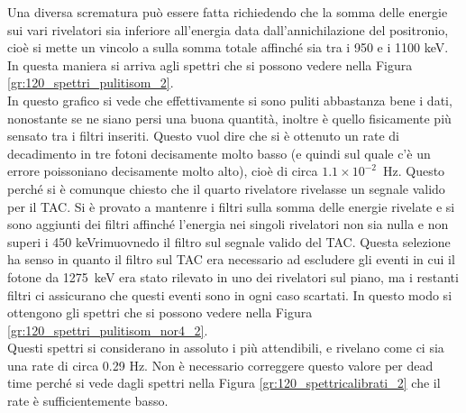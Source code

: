 Una diversa scrematura può essere fatta richiedendo che la somma delle energie sui vari rivelatori sia inferiore all'energia data dall'annichilazione del positronio, cioè si
mette un vincolo a sulla somma totale affinché sia tra i 950 e i 1100 keV. In questa maniera si arriva agli spettri che si possono vedere nella 
Figura \ref{gr:120_spettri_pulitisom_2}.\\


In questo grafico si vede che effettivamente si sono puliti abbastanza bene i dati, nonostante se ne siano persi una buona quantità, inoltre è quello fisicamente più
sensato tra i filtri inseriti. Questo vuol dire che si è ottenuto un rate di decadimento in tre fotoni decisamente molto basso (e quindi sul quale c'è un errore poissoniano
decisamente molto alto), cioè di circa $1.1 \times 10^{-2}$~Hz. Questo perché si è comunque chiesto che il quarto rivelatore rivelasse un
segnale valido per il TAC. Si è provato a mantenre i filtri
sulla somma delle energie rivelate e si sono aggiunti dei filtri affinché l'energia nei singoli rivelatori non sia nulla e non superi i 450 keVrimuovnedo il filtro sul
segnale valido del TAC. Questa selezione ha senso in quanto il filtro sul TAC era necessario ad escludere gli eventi in cui il fotone da 1275~keV era stato rilevato in uno dei rivelatori sul piano, ma i restanti filtri ci assicurano che questi eventi sono in ogni caso scartati. In questo modo si ottengono gli spettri che si possono vedere nella Figura \ref{gr:120_spettri_pulitisom_nor4_2}.\\


Questi spettri si considerano in assoluto i più attendibili, e rivelano come ci sia una rate di circa 0.29 Hz. Non è necessario correggere questo valore per dead time perché
si vede dagli spettri nella Figura \ref{gr:120_spettricalibrati_2} che il rate è sufficientemente basso.
\FloatBarrier

